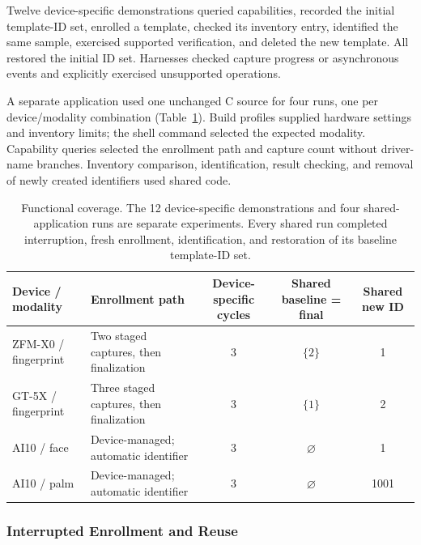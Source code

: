 Twelve device-specific demonstrations queried capabilities, recorded the initial template-ID set, enrolled a template, checked its inventory entry, identified the same sample, exercised supported verification, and deleted the new template. All restored the initial ID set. Harnesses checked capture progress or asynchronous events and explicitly exercised unsupported operations.

A separate application used one unchanged C source for four runs, one per device/modality combination (Table~\ref{tab:eval_functional}). Build profiles supplied hardware settings and inventory limits; the shell command selected the expected modality. Capability queries selected the enrollment path and capture count without driver-name branches. Inventory comparison, identification, result checking, and removal of newly created identifiers used shared code.

\begin{table}[t]
\centering
\caption{Functional coverage. The 12 device-specific demonstrations and four shared-application runs are separate experiments. Every shared run completed interruption, fresh enrollment, identification, and restoration of its baseline template-ID set.}
\label{tab:eval_functional}
\small
\renewcommand{\arraystretch}{1.1}
\setlength{\tabcolsep}{4pt}
\begin{tabularx}{\textwidth}{
|l|>{\raggedright\arraybackslash}X|c|c|c|}
\hline
\textbf{Device / modality} &
\textbf{Enrollment path} &
\textbf{Device-specific cycles} &
\textbf{Shared baseline = final} &
\textbf{Shared new ID} \\ \hline
ZFM-X0 / fingerprint &
Two staged captures, then finalization &
3 & $\{2\}$ & 1 \\ \hline
GT-5X / fingerprint &
Three staged captures, then finalization &
3 & $\{1\}$ & 2 \\ \hline
AI10 / face &
Device-managed; automatic identifier &
3 & $\varnothing$ & 1 \\ \hline
AI10 / palm &
Device-managed; automatic identifier &
3 & $\varnothing$ & 1001 \\ \hline
\end{tabularx}
\end{table}

\subsubsection{Interrupted Enrollment and Reuse}
\label{sec:eval_shared_workflow}

